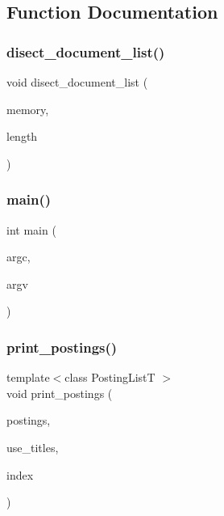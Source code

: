 \subsection{Function Documentation}
\mbox{\label{irk-disect_8cpp_ae8eeb2d378d264ff5b1ec465055629a4}} 
\subsubsection{\texorpdfstring{disect\+\_\+document\+\_\+list()}{disect\_document\_list()}}
{\footnotesize\ttfamily void disect\+\_\+document\+\_\+list (\begin{DoxyParamCaption}\item[{const \mbox{\hyperlink{classirk_1_1memory__view}{irk\+::memory\+\_\+view}} \&}]{memory,  }\item[{int64\+\_\+t}]{length }\end{DoxyParamCaption})}

\mbox{\label{irk-disect_8cpp_a3c04138a5bfe5d72780bb7e82a18e627}} 
\subsubsection{\texorpdfstring{main()}{main()}}
{\footnotesize\ttfamily int main (\begin{DoxyParamCaption}\item[{int}]{argc,  }\item[{char $\ast$$\ast$}]{argv }\end{DoxyParamCaption})}

\mbox{\label{irk-disect_8cpp_a8fd168baf0349318b98384a15e1ed018}} 
\subsubsection{\texorpdfstring{print\+\_\+postings()}{print\_postings()}}
{\footnotesize\ttfamily template$<$class Posting\+ListT $>$ \\
void print\+\_\+postings (\begin{DoxyParamCaption}\item[{const Posting\+ListT \&}]{postings,  }\item[{bool}]{use\+\_\+titles,  }\item[{const \mbox{\hyperlink{namespaceirk_a137711df98ba695c3526ba4004853a47}{irk\+::inverted\+\_\+index\+\_\+view}} \&}]{index }\end{DoxyParamCaption})}

